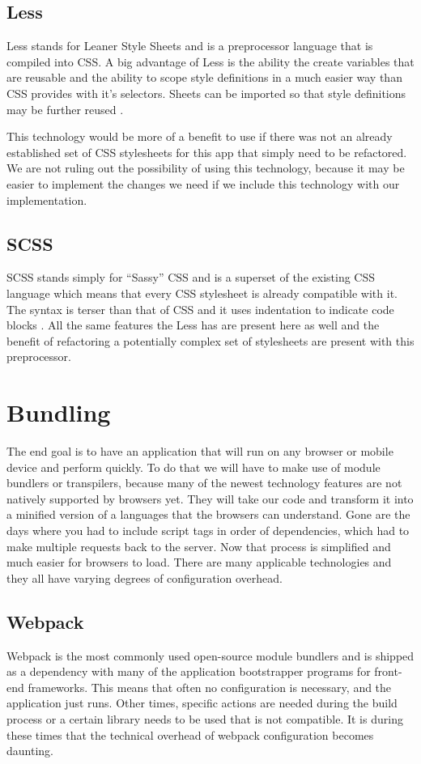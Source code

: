 \documentclass[draftclsnofoot,onecolumn,journal,letterpaper,compsoc,10pt]{IEEEtran}
\begin{document}
        \subsection{Less}
        Less stands for Leaner Style Sheets and is a preprocessor language that is compiled into CSS. A big advantage of Less is the ability the create variables that are reusable and the ability to scope style definitions in a much easier way than CSS provides with it’s selectors. Sheets can be imported so that style definitions may be further reused \cite{less}. 
        
        This technology would be more of a benefit to use if there was not an already established set of CSS stylesheets for this app that simply need to be refactored. We are not ruling out the possibility of using this technology, because it may be easier to implement the changes we need if we include this technology with our implementation.


        \subsection{SCSS}
        SCSS stands simply for “Sassy” CSS and is a superset of the existing CSS language which means that every CSS stylesheet is already compatible with it. The syntax is terser than that of CSS and it uses indentation to indicate code blocks \cite{sass}. All the same features the Less has are present here as well and the benefit of refactoring a potentially complex set of stylesheets are present with this preprocessor.
    \section{Bundling}
    The end goal is to have an application that will run on any browser or mobile device and perform quickly. To do that we will have to make use of module bundlers or transpilers, because many of the newest technology features are not natively supported by browsers yet. They will take our code and transform it into a minified version of a languages that the browsers can understand. Gone are the days where you had to include script tags in order of dependencies, which had to make multiple requests back to the server. Now that process is simplified and much easier for browsers to load. There are many applicable technologies and they all have varying degrees of configuration overhead. 
        \subsection{Webpack}
        Webpack is the most commonly used open-source module bundlers and is shipped as a dependency with many of the application bootstrapper programs for front-end frameworks. This means that often no configuration is necessary, and the application just runs. Other times, specific actions are needed during the build process or a certain library needs to be used that is not compatible. It is during these times that the technical overhead of webpack configuration becomes daunting.
        
\end{document}

